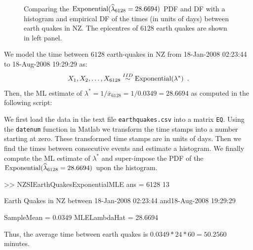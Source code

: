 \begin{figure}[htpb]
\caption{Comparing the $\mbox{{\rm Exponential}}(\widehat{\lambda}_{6128}= 28.6694)$ PDF and DF with a histogram and empirical DF of the times (in units of days) between earth quakes in  NZ.  The epicentres of $6128$ earth quakes are shown in left panel.\label{F:NZSIEarthQuakesExponentialMLE}}
\centering   {}
\end{figure}
\begin{labwork}\label{LW:NZSIEarthQuakesExponentialMLE}  
We model the time between $6128$ earth-quakes in NZ from 18-Jan-2008 02:23:44 to 18-Aug-2008 19:29:29 as:
\[
X_1,X_2,\ldots,X_{6128} \overset{IID}{\sim} \mbox{{\rm Exponential}}(\lambda^*) \enspace .
\]
Then, the ML estimate of $\lambda^* = 1/\overline{x}_{6128} = 1/0.0349=28.6694$ as computed in the following script:

We first load the data in the text file {\tt earthquakes.csv} into a matrix {\tt EQ}.  Using the {\tt datenum} function in {\sc Matlab} we transform the time stamps into a number starting at zero.  These transformed time stamps are in units of days.  Then we find the times between consecutive events and estimate a histogram.  We finally compute the ML estimate of $\lambda^*$ and super-impose the PDF of the $\mbox{{\rm Exponential}}(\widehat{\lambda}_{6128}= 28.6694)$ upon the histogram.
\begin{VrbM}
>> NZSIEarthQuakesExponentialMLE
ans =        6128          13

Earth Quakes in NZ between
18-Jan-2008 02:23:44 and18-Aug-2008 19:29:29

SampleMean =    0.0349
MLELambdaHat =   28.6694
\end{VrbM}
Thus, the average time between earth quakes is $0.0349*24*60=50.2560$ minutes.
\end{labwork}

